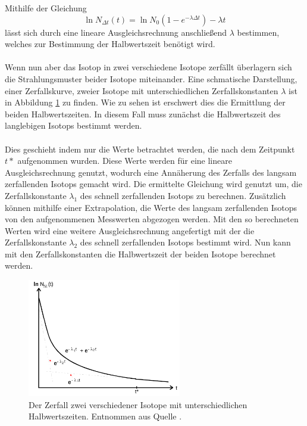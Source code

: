 Mithilfe der Gleichung 
\begin{equation}
    \ln{N_{\Delta t}(t)}=\ln N_0 (1-e^{-\lambda \Delta t}) -\lambda t
    \label{eqn:labmda}
\end{equation}
lässt sich durch eine lineare Ausgleichsrechnung anschließend $\lambda$ bestimmen, welches zur Bestimmung der Halbwertszeit benötigt wird.
\\\\
Wenn nun aber das Isotop in zwei verschiedene Isotope zerfällt überlagern sich die Strahlungsmuster beider Isotope miteinander.
Eine schmatische Darstellung, einer Zerfallskurve, zweier Isotope mit unterschiedlichen Zerfallskonstanten $\lambda$ ist in Abbildung \ref{fig:zerfall2} zu finden.
Wie zu sehen ist erschwert dies die Ermittlung der beiden Halbwertszeiten.
In diesem Fall muss zunächst die Halbwertszeit des langlebigen Isotops bestimmt werden.
\\\\
Dies geschieht indem nur die Werte betrachtet werden, die nach dem Zeitpunkt $t*$ aufgenommen wurden.
Diese Werte werden für eine lineare Ausgleichsrechnung genutzt, wodurch eine Annäherung des Zerfalls des langsam zerfallenden Isotops gemacht wird.
Die ermittelte Gleichung wird genutzt um, die Zerfallskonstante $\lambda_1$ des schnell zerfallenden Isotops zu berechnen.
Zusätzlich können mithilfe einer Extrapolation, die Werte des langsam zerfallenden Isotops von den aufgenommenen Messwerten abgezogen werden.
Mit den so berechneten Werten wird eine weitere Ausgleichsrechnung angefertigt mit der die Zerfallskonstante $\lambda_2$ des schnell zerfallenden Isotops bestimmt wird.
Nun kann mit den Zerfallskonstanten die Halbwertszeit der beiden Isotope berechnet werden.

\begin{figure}
    \centering
    \includegraphics[width=0.6\textwidth]{content/data/zerfall.png}
    \caption{Der Zerfall zwei verschiedener Isotope mit unterschiedlichen Halbwertszeiten. Entnommen aus Quelle \cite{anleitung}.}
    \label{fig:zerfall2}
\end{figure}